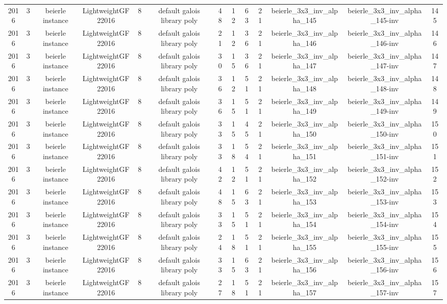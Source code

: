 \begin{tabular}{c c c c c c c c c c c c c}
2016 & 3 & beierle instance & LightweightGF22016 & 8 & default galois library poly & 48 & 12 & 63 & 21 & beierle_3x3_inv_alpha_145 & beierle_3x3_inv_alpha_145-inv & 145 \\
2016 & 3 & beierle instance & LightweightGF22016 & 8 & default galois library poly & 21 & 12 & 36 & 21 & beierle_3x3_inv_alpha_146 & beierle_3x3_inv_alpha_146-inv & 146 \\
2016 & 3 & beierle instance & LightweightGF22016 & 8 & default galois library poly & 30 & 15 & 36 & 21 & beierle_3x3_inv_alpha_147 & beierle_3x3_inv_alpha_147-inv & 147 \\
2016 & 3 & beierle instance & LightweightGF22016 & 8 & default galois library poly & 36 & 12 & 51 & 21 & beierle_3x3_inv_alpha_148 & beierle_3x3_inv_alpha_148-inv & 148 \\
2016 & 3 & beierle instance & LightweightGF22016 & 8 & default galois library poly & 36 & 15 & 51 & 21 & beierle_3x3_inv_alpha_149 & beierle_3x3_inv_alpha_149-inv & 149 \\
2016 & 3 & beierle instance & LightweightGF22016 & 8 & default galois library poly & 33 & 15 & 45 & 21 & beierle_3x3_inv_alpha_150 & beierle_3x3_inv_alpha_150-inv & 150 \\
2016 & 3 & beierle instance & LightweightGF22016 & 8 & default galois library poly & 33 & 18 & 54 & 21 & beierle_3x3_inv_alpha_151 & beierle_3x3_inv_alpha_151-inv & 151 \\
2016 & 3 & beierle instance & LightweightGF22016 & 8 & default galois library poly & 42 & 12 & 51 & 21 & beierle_3x3_inv_alpha_152 & beierle_3x3_inv_alpha_152-inv & 152 \\
2016 & 3 & beierle instance & LightweightGF22016 & 8 & default galois library poly & 48 & 15 & 63 & 21 & beierle_3x3_inv_alpha_153 & beierle_3x3_inv_alpha_153-inv & 153 \\
2016 & 3 & beierle instance & LightweightGF22016 & 8 & default galois library poly & 33 & 15 & 51 & 21 & beierle_3x3_inv_alpha_154 & beierle_3x3_inv_alpha_154-inv & 154 \\
2016 & 3 & beierle instance & LightweightGF22016 & 8 & default galois library poly & 24 & 18 & 51 & 21 & beierle_3x3_inv_alpha_155 & beierle_3x3_inv_alpha_155-inv & 155 \\
2016 & 3 & beierle instance & LightweightGF22016 & 8 & default galois library poly & 33 & 15 & 63 & 21 & beierle_3x3_inv_alpha_156 & beierle_3x3_inv_alpha_156-inv & 156 \\
2016 & 3 & beierle instance & LightweightGF22016 & 8 & default galois library poly & 27 & 18 & 51 & 21 & beierle_3x3_inv_alpha_157 & beierle_3x3_inv_alpha_157-inv & 157 \\

\end{tabular}
